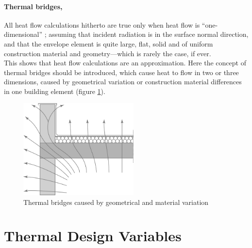 \paragraph{Thermal bridges,}
All heat flow calculations hitherto are true only when heat flow is ``one-dimensional'' \cite{szokolay08}; assuming that incident radiation is in the surface normal direction, and that the envelope element is quite large, flat, solid and of uniform construction material and geometry---which is rarely the case, if ever.\\
This shows that heat flow calculations are an approximation. Here the concept of thermal bridges should be introduced, which cause heat to flow in two or three dimensions, caused by geometrical variation or construction material differences in one building element (figure
\ref{ThermalBridges}).
\begin{figure}[htbp]
\centering
\includegraphics[width=6cm]{./Images/8-ThermalBridges}
\caption[Thermal Bridges]{Thermal bridges caused by geometrical and material variation
\cite{szokolay08}} \label{ThermalBridges}
\end{figure}


\label{sec:ThermalDesignVariables}
\section{Thermal Design Variables}
\label{sec:ThermalDesignVariables}

